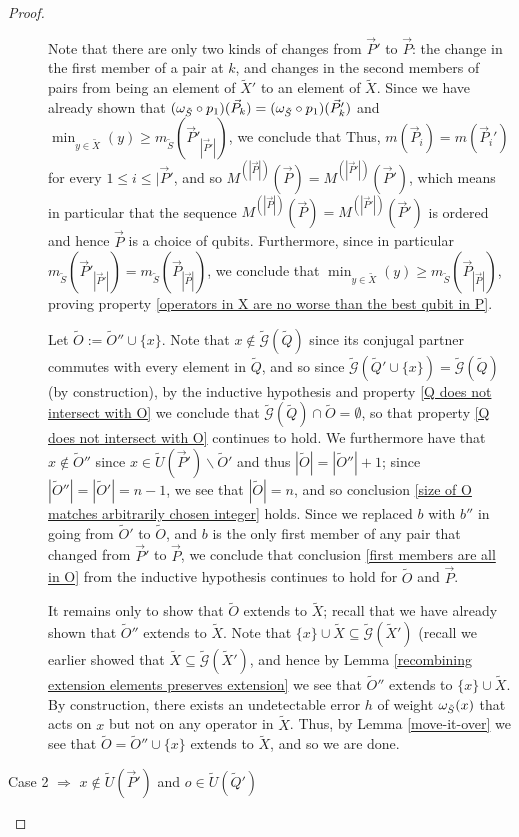\documentclass[twocolumn,showpacs,preprintnumbers,amsmath,amssymb,nofootinbib,pra,floatfix]{revtex4-1}
\newcommand{\lst}{\vec}
\newcommand{\set}{\tilde}
\newcommand{\genfun}{\tilde{\mathcal{G}}}
\begin{document}
\begin{proof}
\begin{description}
Note that there are only two kinds of changes from $\lst P'$ to $\lst P$:  the change in the first member of a pair at $k$, and changes in the second members of pairs from being an element of $\set X'$ to an element of $\set X$.  Since we have already shown that $(\om_{\set S}\circ p_1)(\lst P_k) = (\om_{\set S}\circ p_1)(\lst P_k')$ and $\min_{y\in\set X}(y) \ge m_{\set S}(\lst P'_{|\lst P'|})$, we conclude that Thus, $m(\lst P_i)=m(\lst P_i')$ for every $1 \le i \le |\lst P'$, and so $M^{(|\lst P|)}(\lst P)=M^{(|\lst P'|)}(\lst P')$, which means in particular that the sequence $M^{(|\lst P|)}(\lst P)=M^{(|\lst P'|)}(\lst P')$ is ordered and hence $\lst P$ is a choice of qubits.  Furthermore, since in particular $m_{\set S}(\lst P'_{|\lst P'|})=m_{\set S}(\lst P_{|\lst P|})$, we conclude that $\min_{y\in\set X}(y)\geq m_{\set S}(\lst P_{|\lst P|})$, proving property \ref{operators in X are no worse than the best qubit in P}.

Let $\set O:=\set O''\cup\{x\}$.  Note that $x\notin \genfun(\set Q)$ since its conjugal partner commutes with every element in $\set Q$, and so since $\genfun(\set Q'\cup\{x\})=\genfun(\set Q)$ (by construction), by the inductive hypothesis and property \ref{Q does not intersect with O} we conclude that $\genfun(\set Q)\cap\set O=\emptyset$, so that property \ref{Q does not intersect with O} continues to hold.  We furthermore have that $x\notin \set O''$ since $x\in \set U(\lst P')\backslash \set O'$ and thus $|\set O|=|\set O''|+1$;  since $|\set O''|=|\set O'|=n-1$, we see that $|\set O|=n$, and so conclusion \ref{size of O matches arbitrarily chosen integer} holds.  Since we replaced $b$ with $b''$ in going from $\set O'$ to $\set O$, and $b$ is the only first member of any pair that changed from $\lst P'$ to $\lst P$, we conclude that conclusion \ref{first members are all in O} from the inductive hypothesis continues to hold for $\set O$ and $\lst P$.

It remains only to show that $\set O$ extends to $\set X$;  recall that we have already shown that $\set O''$ extends to $\set X$. Note that $\{x\}\cup\set X\subseteq \genfun(\set X')$ (recall we earlier showed that $\set X\subseteq \genfun(\set X')$, and hence by Lemma \ref{recombining extension elements preserves extension} we see that $\set O''$ extends to $\{x\}\cup\set X$.  By construction, there exists an undetectable error $h$ of weight $\om_{\set S}(x)$ that acts on $x$ but not on any operator in $\set X$.  Thus, by Lemma \ref{move-it-over} we see that $\set O=\set O''\cup\{x\}$ extends to $\set X$, and so we are done.
\item[Case 2 $\Rightarrow$ $x\notin \set U(\lst P')$ and $o\in\set U(\set Q')$]


\end{description}
\end{proof}
\end{document}
